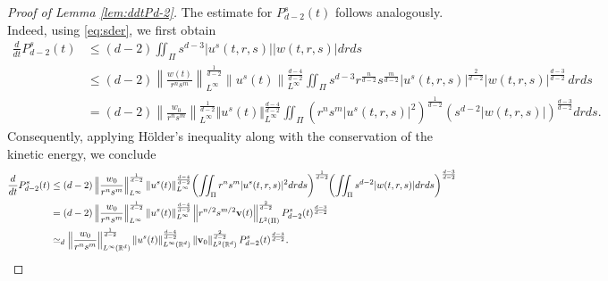 \documentclass[11pt]{amsart}
\theoremstyle{definition}
\theoremstyle{remark}
\numberwithin{equation}{section}
\numberwithin{equation}{section}
\newcommand{\nrm}[1]{\Vert#1\Vert}
\newcommand{\0}{\emptyset}
\newcommand{\ift}{\infty}
\newcommand{\bfv}{{\bf v}}
\newcommand{\bbR}{\mathbb R}
\begin{document}
\begin{proof}[Proof of Lemma \ref{lem:ddtPd-2}]
	The estimate for $P_{d-2}^{s}(t)$ follows analogously. Indeed, using \eqref{eq:sder}, we first obtain
		\begin{equation}
			\begin{aligned}
				\frac{d}{dt}P_{d-2}^{s}(t)&\leq (d-2)\iint_{\Pi}s^{d-3}|u^{s}(t,r,s)||w(t,r,s)|drds\\
				&\le (d-2) \left\| \frac{w(t)}{r^{n}s^{m}}\right\|_{L^{\ift}}^{\frac{1}{d-2}} \left\| u^{s}(t) \right\|_{L^{\ift}}^{\frac{d-4}{d-2}} \iint_{\Pi}s^{d-3}r^{\frac{n}{d-2}}s^{\frac{m}{d-2}}|u^{s}(t,r,s)|^{\frac{2}{d-2}}|w(t,r,s)|^{\frac{d-3}{d-2}} \,drds\\
				&=(d-2) \left\| \frac{w_0}{r^{n}s^{m}}\right\|_{L^{\ift}}^{\frac{1}{d-2}}\nrm{u^{s}(t)}_{L^{\ift}}^{\frac{d-4}{d-2}} \iint_{\Pi} \left(r^{n}s^{m}|u^{s}(t,r,s)|^{2} \right)^{\frac{1}{d-2}} \left(s^{d-2}|w(t,r,s)|\right)^{\frac{d-3}{d-2}}drds. 
			\end{aligned}
		\end{equation}
	Consequently, applying H\"{o}lder's inequality along with the conservation of the kinetic energy, we conclude
		\begin{equation}
			\begin{aligned}
				\frac{d}{dt}P_{d-2}^{s}(t)&\le (d-2) \left\| \frac{w_0}{r^{n}s^{m}}\right\|_{L^{\ift}}^{\frac{1}{d-2}}\nrm{u^{s}(t)}_{L^{\ift}}^{\frac{d-4}{d-2}} \! \left(\iint_{\Pi}r^{n}s^{m}|u^{s}(t,r,s)|^{2}drds\right)^{\frac{1}{d-2}} \! \! \left( \iint_{\Pi} s^{d-2}|w(t,r,s)|drds\right)^{\frac{d-3}{d-2}}\\
				&= (d-2) \left\| \frac{w_{0}}{r^{n}s^{m}}\right\|_{L^{\ift}}^{\frac{1}{d-2}}\left\| u^{s}(t) \right\|_{L^{\ift}}^{\frac{d-4}{d-2}}\left\| r^{n/2}s^{m/2}\bfv(t)\right\|_{L^{2}(\Pi)}^{\frac{2}{d-2}}P_{d-2}^{s}(t)^{\frac{d-3}{d-2}}\\
				&\simeq_d \left\| \frac{w_{0}}{r^{n}s^{m}}\right\|_{L^{\ift}(\bbR^{d})}^{\frac{1}{d-2}}\left\|u^{s}(t)\right\|_{L^{\ift}(\bbR^{d})}^{\frac{d-4}{d-2}}\left\| \bfv_{0} \right\|_{L^{2}(\bbR^{d})}^{\frac{2}{d-2}}P_{d-2}^{s}(t)^{\frac{d-3}{d-2}}.
			\end{aligned}
		\end{equation}
	\end{proof}
\end{document}
